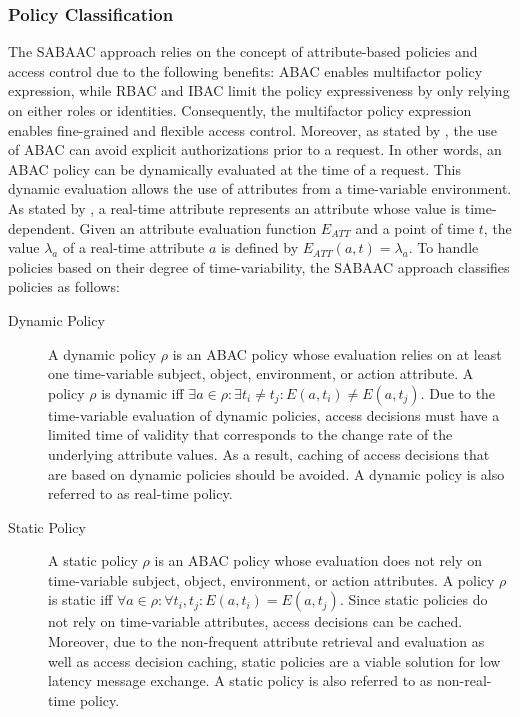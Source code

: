 \subsubsection{Policy Classification}
The SABAAC approach relies on the concept of attribute-based policies and access control due to the following benefits:
ABAC enables multifactor policy expression, while RBAC and IBAC limit the policy expressiveness by only relying on either roles or identities.
Consequently, the multifactor policy expression enables fine-grained and flexible access control.
Moreover, as stated by \citeauthor{Hu2014} \cite{Hu2014}, the use of ABAC can avoid explicit authorizations prior to a request.
In other words, an ABAC policy can be dynamically evaluated at the time of a request.
This dynamic evaluation allows the use of attributes from a time-variable environment.
As stated by \citeauthor{Burmester2013} \cite{Burmester2013}, a real-time attribute represents an attribute whose value is time-dependent.
Given an attribute evaluation function $E_{ATT}$ and a point of time $t$, the value $\lambda_a$ of a real-time attribute $a$ is defined by $E_{ATT}(a, t) = \lambda_a$.
To handle policies based on their degree of time-variability, the SABAAC approach classifies policies as follows:
\begin{description}
    \item[Dynamic Policy] A dynamic policy $\rho$ is an ABAC policy whose evaluation relies on at least one time-variable subject, object, environment, or action attribute.
    A policy $\rho$ is dynamic iff $\exists a \in \rho: \exists t_i \neq t_j: E(a,t_i) \neq E(a,t_j)$.
    Due to the time-variable evaluation of dynamic policies, access decisions must have a limited time of validity that corresponds to the change rate of the underlying attribute values.
    As a result, caching of access decisions that are based on dynamic policies should be avoided.
    A dynamic policy is also referred to as real-time policy.
    \item[Static Policy] A static policy $\rho$ is an ABAC policy whose evaluation does not rely on time-variable subject, object, environment, or action attributes.
    A policy $\rho$ is static iff $\forall a \in \rho: \forall t_i,t_j: E(a,t_i) = E(a,t_j)$.
    Since static policies do not rely on time-variable attributes, access decisions can be cached.
    Moreover, due to the non-frequent attribute retrieval and evaluation as well as access decision caching, static policies are a viable solution for low latency message exchange.
    A static policy is also referred to as non-real-time policy.
\end{description}

